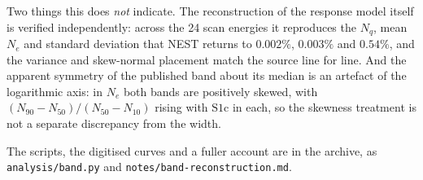\documentclass[11pt,a4paper]{article}
\begin{document}
Two things this does \emph{not} indicate. The reconstruction of the response
model itself is verified independently: across the 24 scan energies it
reproduces the \(N_q\), mean \(N_e\) and standard deviation that NEST returns
to \(0.002\%\), \(0.003\%\) and \(0.54\%\), and the variance and skew-normal
placement match the source line for line. And the apparent symmetry of the
published band about its median is an artefact of the logarithmic axis: in
\(N_e\) both bands are positively skewed, with
\((N_{90}-N_{50})/(N_{50}-N_{10})\) rising with \(\mathrm{S1c}\) in each, so
the skewness treatment is not a separate discrepancy from the width.

The scripts, the digitised curves and a fuller account are in the archive, as
\texttt{analysis/band.py} and \texttt{notes/band-reconstruction.md}.



\end{document}
